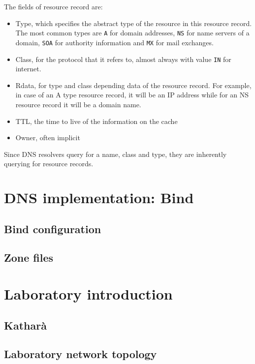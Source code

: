 \documentclass[11pt,a4paper]{article}
\begin{document}
\hfill \break
\noindent
The fields of resource record are:
\begin{itemize}
\item Type, which specifies the abstract type of the resource in this resource record. The most common types are \texttt{A} for domain addresses, \texttt{NS} for name servers of a domain, \texttt{SOA} for authority information and \texttt{MX} for mail exchanges.
\item Class, for the protocol that it refers to, almost always with value \texttt{IN} for internet.
\item Rdata, for type and class depending data of the resource record. For example, in case of an A type resource record, it will be an IP address while for an NS resource record it will be a domain name.
\item TTL, the time to live of the information on the cache
\item Owner, often implicit
\end{itemize}

\hfill \break
\noindent
Since DNS resolvers query for a name, class and type, they are inherently querying for resource records.

\section{DNS implementation: Bind}

\subsection{Bind configuration}

\subsection{Zone files}

\section{Laboratory introduction}

\subsection{Katharà}

\subsection{Laboratory network topology}
\end{document}
